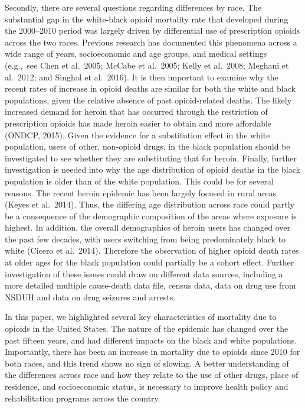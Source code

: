 \documentclass[12pt, a4paper]{article}
\begin{document}
Secondly, there are several questions regarding differences by race. The substantial gap in the white-black opioid mortality rate that developed during the 2000--2010 period was largely driven by differential use of prescription opioids across the two races. Previous research has documented this phenomena across a wide range of years, socioeconomic and age groups, and medical settings (e.g.,\ see Chen et al.\ 2005; McCabe et al.\ 2005; Kelly et al.\ 2008; Meghani et al.\ 2012; and Singhal et al.\ 2016). It is then important to examine why the recent rates of increase in opioid deaths are similar for both the white and black populations, given the relative absence of past opioid-related deaths. The likely increased demand for heroin that has occurred through the restriction of prescription opioids has made heroin easier to obtain and more affordable (ONDCP, 2015). Given the evidence for a substitution effect in the white population, users of other, non-opioid drugs, in the black population should be investigated to see whether they are substituting that for heroin. Finally, further investigation is needed into why the age distribution of opioid deaths in the black population is older than of the white population. This could be for several reasons. The recent heroin epidemic has been largely focused in rural areas (Keyes et al.\ 2014). Thus, the differing age distribution across race could partly be a consequence of the demographic composition of the areas where exposure is highest. In addition, the overall demographics of heroin users has changed over the past few decades, with users switching from being predominately black to white (Cicero et al.\ 2014). Therefore the observation of higher opioid death rates at older ages for the black population could partially be a cohort effect. Further investigation of these issues could draw on different data sources, including a more detailed multiple cause-death data file, census data, data on drug use from NSDUH and data on drug seizures and arrests. 

In this paper, we highlighted several key characteristics of mortality due to opioids in the United States. The nature of the epidemic has changed over the past fifteen years, and had different impacts on the black and white populations. Importantly, there has been an increase in mortality due to opioids since 2010 for both races, and this trend shows no sign of slowing. A better understanding of the differences across race and how they relate to the use of other drugs, place of residence, and socioeconomic status, is necessary to improve health policy and rehabilitation programs across the country. 
\end{document}

